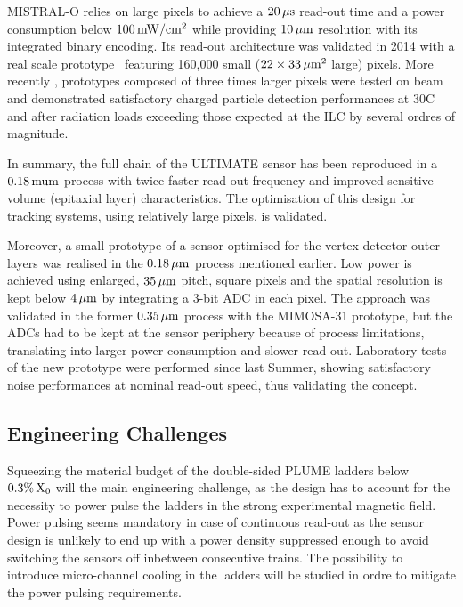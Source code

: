 MISTRAL-O relies on large pixels to achieve a $\unit[20]{\mu s}$ read-out
time and a power consumption below $\unit[100]{mW/cm^2}$ while providing
$\unit[10]{\mu m}$ resolution with its integrated binary encoding.
Its read-out architecture was validated in 2014 with a real scale
prototype~\cite{Winter:NSSMIC:2014} featuring 160,000 small ($22\times\unit[33]{\mu m^2}$
large) pixels. More recently \cite{Winter:ALCW15}, prototypes composed of
three times larger pixels were tested on beam and demonstrated satisfactory
charged particle detection performances at
30\textdegree C and after radiation loads exceeding those expected at the
ILC by several ordres of magnitude.

In summary, the full chain of the ULTIMATE sensor has been reproduced
in a $\unit[0.18]{mu m}$ process with twice faster read-out frequency and
improved sensitive volume (epitaxial layer) characteristics. The
optimisation of this design for tracking systems, using relatively
large pixels, is validated.

Moreover, a small prototype of a sensor optimised for the vertex detector
outer layers was realised in the $\unit[0.18]{\mu m}$ process mentioned earlier.
Low power is achieved using enlarged, $\unit[35]{\mu m}$ pitch, square pixels and the
spatial resolution is kept below $\unit[4]{\mu m}$ by integrating a 3-bit ADC in
each pixel. The approach was validated in the former $\unit[0.35]{\mu m}$ process
with the MIMOSA-31 prototype, but the ADCs had to be kept at the sensor
periphery because of process limitations, translating into larger
power consumption and slower read-out. Laboratory tests of the new
prototype were performed since last Summer, showing satisfactory noise performances at nominal read-out speed, thus validating the concept.


\subsection{Engineering Challenges}
Squeezing the material budget of the double-sided PLUME ladders
below $\unit[0.3\%]{X_0}$ will the main engineering challenge, as the design
has to account for the necessity to power pulse the ladders in the
strong experimental magnetic field. Power pulsing seems mandatory
in case of continuous read-out as the sensor design is unlikely to
end up with a power density suppressed enough to avoid switching
the sensors off inbetween consecutive trains. The possibility to
introduce micro-channel cooling in the ladders will be studied in
ordre to mitigate the power pulsing requirements.

